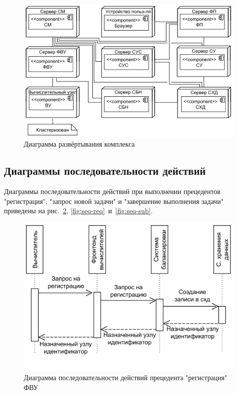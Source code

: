 \documentclass[a4paper,12pt]{report}
\numberwithin{equation}{section}
\begin{document}
\begin{figure}
  \centering
  \includegraphics[width=\linewidth]{../diagrams/common/deployment}
  \caption{Диаграмма развёртывания комплекса}
  \label{fig:depl-common}
\end{figure}

\subsection{Диаграммы последовательности действий}
Диаграммы последовательности действий при выполнении прецедентов "регистрация", "запрос новой задачи" и "завершение выполнения задачи" приведены на рис.~\ref{fig:seq-reg}, \ref{fig:seq-req}~и~\ref{fig:seq-sub}.

\begin{figure}
  \centering
  \includegraphics[width=.7\linewidth]{../diagrams/frontnode/seq-register}
  \caption{Диаграмма последовательности действий прецедента "регистрация" ФВУ}
  \label{fig:seq-reg}
\end{figure}
\end{document}
